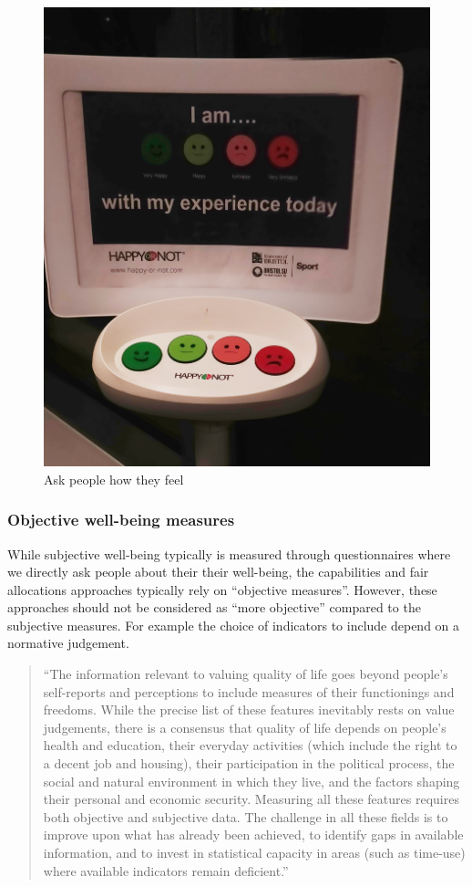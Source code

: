 \documentclass[]{book}
\begin{document}
\begin{figure}

{\centering \includegraphics[width=0.7\linewidth]{_resources/chapter_wellbeing/subwb} 

}

\caption{Ask people how they feel}\label{fig:wfig2}
\end{figure}

\hypertarget{objective-well-being-measures}{%
\subsubsection{Objective well-being measures}\label{objective-well-being-measures}}

While subjective well-being typically is measured through questionnaires where we directly ask people about their their well-being, the capabilities and fair allocations approaches typically rely on ``objective measures''. However, these approaches should not be considered as ``more objective'' compared to the subjective measures. For example the choice of indicators to include depend on a normative judgement.

\begin{quote}
``The information relevant to valuing quality of life goes beyond people's self-reports and perceptions to include measures of their functionings and freedoms. While the precise list of these features inevitably rests on value judgements, there is a consensus that quality of life depends on people's health and education, their everyday activities (which include the right to a decent job and housing), their participation in the political process, the social and natural
environment in which they live, and the factors shaping their personal and economic security. Measuring all these features requires both objective and subjective data. The challenge in all these fields is to improve upon what has already been achieved, to identify gaps in available information, and to invest in statistical capacity in areas (such as time-use) where available indicators remain deficient.''
\end{quote}
\end{document}
